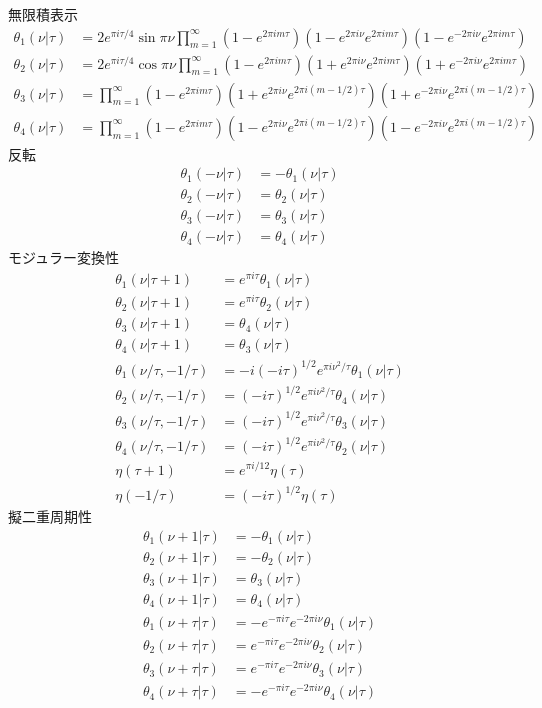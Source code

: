 無限積表示
\begin{align}
\theta_1(\nu|\tau)&=2e^{\pi i \tau/4}\sin\pi\nu \prod_{m=1}^{\infty}(1-e^{2\pi i m\tau})(1-e^{2\pi i\nu}e^{2\pi i m\tau})(1-e^{-2\pi i\nu}e^{2\pi i m\tau})\\
\theta_2(\nu|\tau)&=2e^{\pi i \tau/4}\cos\pi\nu \prod_{m=1}^{\infty}(1-e^{2\pi i m\tau})(1+e^{2\pi i\nu}e^{2\pi i m\tau})(1+e^{-2\pi i\nu}e^{2\pi i m\tau})\\
\theta_3(\nu|\tau)&=\prod_{m=1}^{\infty}(1-e^{2\pi i m\tau})(1+e^{2\pi i\nu}e^{2\pi i (m-1/2)\tau})(1+e^{-2\pi i\nu}e^{2\pi i (m-1/2)\tau})\\
\theta_4(\nu|\tau)&=\prod_{m=1}^{\infty}(1-e^{2\pi i m\tau})(1-e^{2\pi i\nu}e^{2\pi i (m-1/2)\tau})(1-e^{-2\pi i\nu}e^{2\pi i (m-1/2)\tau})
\end{align}
反転
\begin{align}
\theta_1(-\nu|\tau)&=-\theta_1(\nu|\tau)\\
\theta_2(-\nu|\tau)&=\theta_2(\nu|\tau)\\
\theta_3(-\nu|\tau)&=\theta_3(\nu|\tau)\\
\theta_4(-\nu|\tau)&=\theta_4(\nu|\tau)
\end{align}
モジュラー変換性
\begin{align}
\theta_1(\nu|\tau+1)&=e^{\pi i \tau}\theta_1(\nu|\tau)\\
\theta_2(\nu|\tau+1)&=e^{\pi i \tau}\theta_2(\nu|\tau)\\
\theta_3(\nu|\tau+1)&=\theta_4(\nu|\tau)\\
\theta_4(\nu|\tau+1)&=\theta_3(\nu|\tau)\\
\theta_1(\nu/\tau,-1/\tau)&=-i(-i\tau)^{1/2}e^{\pi i \nu^2/\tau}\theta_1(\nu|\tau)\\
\theta_2(\nu/\tau,-1/\tau)&=(-i\tau)^{1/2}e^{\pi i \nu^2/\tau}\theta_4(\nu|\tau)\\
\theta_3(\nu/\tau,-1/\tau)&=(-i\tau)^{1/2}e^{\pi i \nu^2/\tau}\theta_3(\nu|\tau)\\
\theta_4(\nu/\tau,-1/\tau)&=(-i\tau)^{1/2}e^{\pi i \nu^2/\tau}\theta_2(\nu|\tau)\\
\eta(\tau+1)&=e^{\pi i/12}\eta(\tau)\\
\eta(-1/\tau)&=(-i\tau)^{1/2}\eta(\tau)
\end{align}
擬二重周期性
\begin{align}
\theta_1(\nu+1|\tau)&=-\theta_1(\nu|\tau)\\
\theta_2(\nu+1|\tau)&=-\theta_2(\nu|\tau)\\
\theta_3(\nu+1|\tau)&=\theta_3(\nu|\tau)\\
\theta_4(\nu+1|\tau)&=\theta_4(\nu|\tau)\\
\theta_1(\nu+\tau|\tau)&=-e^{-\pi i \tau}e^{-2\pi i \nu}\theta_1(\nu|\tau)\label{quasidoubleperiod}\\
\theta_2(\nu+\tau|\tau)&=e^{-\pi i \tau}e^{-2\pi i \nu}\theta_2(\nu|\tau)\\
\theta_3(\nu+\tau|\tau)&=e^{-\pi i \tau}e^{-2\pi i \nu}\theta_3(\nu|\tau)\\
\theta_4(\nu+\tau|\tau)&=-e^{-\pi i \tau}e^{-2\pi i \nu}\theta_4(\nu|\tau)
\end{align}
